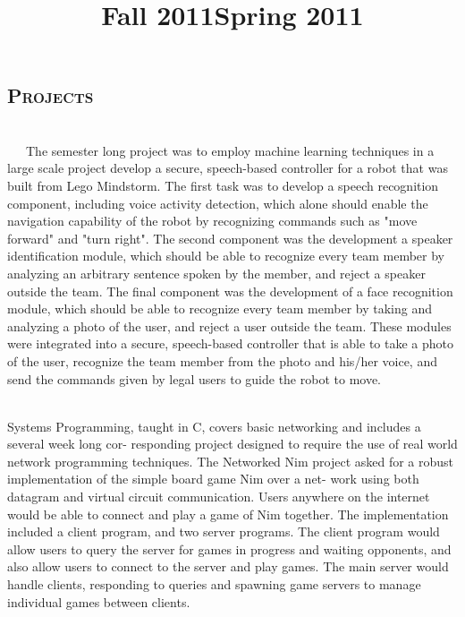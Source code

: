 \begin{resume}
\section{\textsc{Projects}}

\title{Fall 2011}
\dates{}
\begin{position}
\vspace{-10pt}\\
\ \ \ The semester long project was to employ machine learning techniques in a large scale project develop a secure, speech-based controller for a robot that was built from Lego Mindstorm. The first task was to develop a speech recognition component, including voice activity detection, which alone should enable the navigation capability of the robot by recognizing commands such as "move forward" and "turn right". The second component was the development a speaker identification module, which should be able to recognize every team member by analyzing an arbitrary sentence spoken by the member, and reject a speaker outside the team. The final component was the development of a face recognition module, which should be able to recognize every team member by taking and analyzing a photo of the user, and reject a user outside the team. These modules were integrated into a secure, speech-based controller that is able to take a photo of the user, recognize the team member from the photo and his/her voice, and send the commands given by legal users to guide the robot to move.
\end{position}

\title{Spring 2011}
\dates{}
\begin{position}
\vspace{-10pt} \\
Systems Programming, taught in C, covers basic networking and includes a several week long cor-
responding project designed to require the use of real world network programming techniques. The
Networked Nim project asked for a robust implementation of the simple board game Nim over a net-
work using both datagram and virtual circuit communication. Users anywhere on the internet would be
able to connect and play a game of Nim together. The implementation included a client program, and
two server programs. The client program would allow users to query the server for games in progress
and waiting opponents, and also allow users to connect to the server and play games. The main server
would handle clients, responding to queries and spawning game servers to manage individual games
between clients.
\end{position}


\end{resume}
